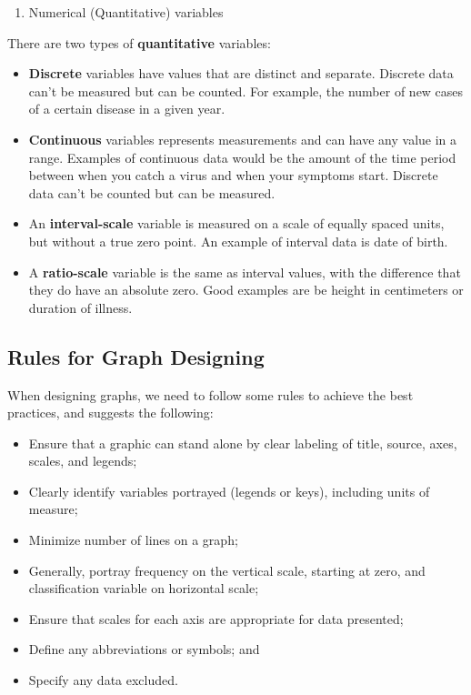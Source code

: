 \documentclass[]{book}
\providecommand{\tightlist}{%
  \setlength{\itemsep}{0pt}\setlength{\parskip}{0pt}}
\begin{document}
\begin{enumerate}
\def\labelenumi{\arabic{enumi}.}
\setcounter{enumi}{1}
\tightlist
\item
  Numerical (Quantitative) variables
\end{enumerate}

There are two types of \textbf{quantitative} variables:

\begin{itemize}
\item
  \textbf{Discrete} variables have values that are distinct and
  separate. Discrete data can't be measured but can be counted. For
  example, the number of new cases of a certain disease in a given year.
\item
  \textbf{Continuous} variables represents measurements and can have any
  value in a range. Examples of continuous data would be the amount of
  the time period between when you catch a virus and when your symptoms
  start. Discrete data can't be counted but can be measured.
\item
  An \textbf{interval-scale} variable is measured on a scale of equally
  spaced units, but without a true zero point. An example of interval
  data is date of birth.
\item
  A \textbf{ratio-scale} variable is the same as interval values, with
  the difference that they do have an absolute zero. Good examples are
  be height in centimeters or duration of illness.
\end{itemize}

\subsection{Rules for Graph Designing}\label{rules-for-graph-designing}

When designing graphs, we need to follow some rules to achieve the best
practices, and \citet{dicker1992principles} suggests the following:

\begin{itemize}
\item
  Ensure that a graphic can stand alone by clear labeling of title,
  source, axes, scales, and legends;
\item
  Clearly identify variables portrayed (legends or keys), including
  units of measure;
\item
  Minimize number of lines on a graph;
\item
  Generally, portray frequency on the vertical scale, starting at zero,
  and classification variable on horizontal scale;
\item
  Ensure that scales for each axis are appropriate for data presented;
\item
  Define any abbreviations or symbols; and
\item
  Specify any data excluded.
\end{itemize}
\end{document}
